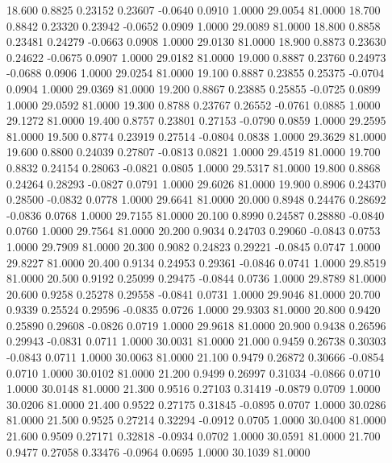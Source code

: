   18.600   0.8825   0.23152   0.23607  -0.0640   0.0910   1.0000  29.0054  81.0000
  18.700   0.8842   0.23320   0.23942  -0.0652   0.0909   1.0000  29.0089  81.0000
  18.800   0.8858   0.23481   0.24279  -0.0663   0.0908   1.0000  29.0130  81.0000
  18.900   0.8873   0.23630   0.24622  -0.0675   0.0907   1.0000  29.0182  81.0000
  19.000   0.8887   0.23760   0.24973  -0.0688   0.0906   1.0000  29.0254  81.0000
  19.100   0.8887   0.23855   0.25375  -0.0704   0.0904   1.0000  29.0369  81.0000
  19.200   0.8867   0.23885   0.25855  -0.0725   0.0899   1.0000  29.0592  81.0000
  19.300   0.8788   0.23767   0.26552  -0.0761   0.0885   1.0000  29.1272  81.0000
  19.400   0.8757   0.23801   0.27153  -0.0790   0.0859   1.0000  29.2595  81.0000
  19.500   0.8774   0.23919   0.27514  -0.0804   0.0838   1.0000  29.3629  81.0000
  19.600   0.8800   0.24039   0.27807  -0.0813   0.0821   1.0000  29.4519  81.0000
  19.700   0.8832   0.24154   0.28063  -0.0821   0.0805   1.0000  29.5317  81.0000
  19.800   0.8868   0.24264   0.28293  -0.0827   0.0791   1.0000  29.6026  81.0000
  19.900   0.8906   0.24370   0.28500  -0.0832   0.0778   1.0000  29.6641  81.0000
  20.000   0.8948   0.24476   0.28692  -0.0836   0.0768   1.0000  29.7155  81.0000
  20.100   0.8990   0.24587   0.28880  -0.0840   0.0760   1.0000  29.7564  81.0000
  20.200   0.9034   0.24703   0.29060  -0.0843   0.0753   1.0000  29.7909  81.0000
  20.300   0.9082   0.24823   0.29221  -0.0845   0.0747   1.0000  29.8227  81.0000
  20.400   0.9134   0.24953   0.29361  -0.0846   0.0741   1.0000  29.8519  81.0000
  20.500   0.9192   0.25099   0.29475  -0.0844   0.0736   1.0000  29.8789  81.0000
  20.600   0.9258   0.25278   0.29558  -0.0841   0.0731   1.0000  29.9046  81.0000
  20.700   0.9339   0.25524   0.29596  -0.0835   0.0726   1.0000  29.9303  81.0000
  20.800   0.9420   0.25890   0.29608  -0.0826   0.0719   1.0000  29.9618  81.0000
  20.900   0.9438   0.26596   0.29943  -0.0831   0.0711   1.0000  30.0031  81.0000
  21.000   0.9459   0.26738   0.30303  -0.0843   0.0711   1.0000  30.0063  81.0000
  21.100   0.9479   0.26872   0.30666  -0.0854   0.0710   1.0000  30.0102  81.0000
  21.200   0.9499   0.26997   0.31034  -0.0866   0.0710   1.0000  30.0148  81.0000
  21.300   0.9516   0.27103   0.31419  -0.0879   0.0709   1.0000  30.0206  81.0000
  21.400   0.9522   0.27175   0.31845  -0.0895   0.0707   1.0000  30.0286  81.0000
  21.500   0.9525   0.27214   0.32294  -0.0912   0.0705   1.0000  30.0400  81.0000
  21.600   0.9509   0.27171   0.32818  -0.0934   0.0702   1.0000  30.0591  81.0000
  21.700   0.9477   0.27058   0.33476  -0.0964   0.0695   1.0000  30.1039  81.0000
